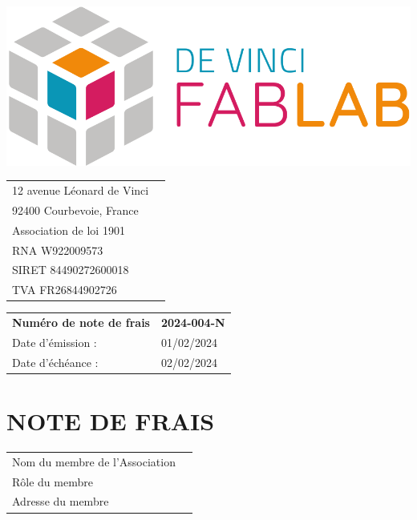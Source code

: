 \documentclass[11pt,a4paper]{article}
\begin{document}
\thispagestyle{empty}


\begin{minipage}{0.4\textwidth}
    \includegraphics[width=0.7\linewidth]{../assets/logo_fablab.png}

    \vspace{0.5cm}

    \begin{tabular}{ll}
        12 avenue Léonard de Vinci \\
        92400 Courbevoie, France   \\
        Association de loi 1901    \\
        RNA W922009573             \\
        SIRET 84490272600018       \\
        TVA  FR26844902726         \\
    \end{tabular}
\end{minipage}\begin{minipage}{0.6\textwidth}
    \begin{flushright}
        \begin{tabular}{ll}
            \textbf{Numéro de note de frais} & \textbf{2024-004-N} \\
            Date d'émission :                & 01/02/2024          \\
            Date d'échéance :                & 02/02/2024          \\
        \end{tabular}
    \end{flushright}
\end{minipage}

\begin{minipage}[t]{0.5\textwidth}
    \hspace*{0pt}\vspace*{\fill}
    \section*{\LARGE NOTE DE FRAIS}
\end{minipage}\begin{minipage}[t]{0.5\textwidth}
    \begin{framed}
        \begin{tabular}{ll}
            Nom du membre de l'Association \\
            Rôle du membre                 \\
            Adresse du membre              \\
        \end{tabular}
    \end{framed}
    \vspace{0.1cm}
\end{minipage}
\end{document}
